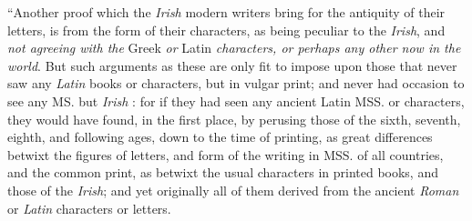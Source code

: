\documentclass[11pt,oneside]{memoir}
\begin{document}
``Another proof which the \textit{Irish} modern writers bring for the antiquity of their letters, is from the form of their characters, as being peculiar to the \textit{Irish}, and \textit{not agreeing with the} Greek \textit{or} Latin \textit{characters, or perhaps any other now in the world}.
But such arguments as these are only fit to impose upon those that never saw any \textit{Latin} books or characters, but in vulgar print; and never had occasion to see any MS. but \textit{Irish} : for if they had seen any ancient 
Latin MSS. or characters, they would have found, in the first place, by perusing those of the sixth, seventh, eighth, and following ages, down to the time of printing, as great differences betwixt the figures of letters, and form of the writing in MSS. of all countries, and the common print, as betwixt the usual characters in printed books, and those of the \textit{Irish}; and yet originally all of them derived from the ancient \textit{Roman} or \textit{Latin} characters or letters. 
\end{document}
